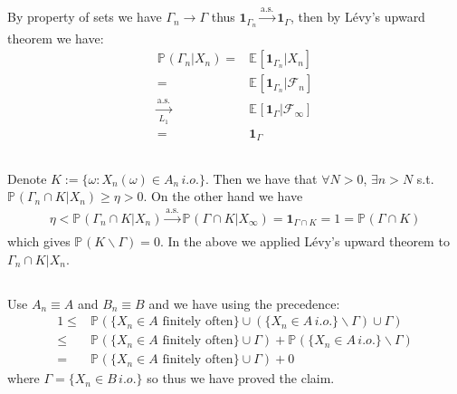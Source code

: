 \documentclass[11pt,a4paper]{ctexart}
\numberwithin{equation}{section}%
\newcommand{\F}{\mathcal{F}}
\begin{document}
\subsection{}

By property of sets we have $ \Gamma _n \to \Gamma  $ thus $ \mathbf{1}_{\Gamma _n} \xrightarrow[]{\mathrm{a.s.}}  \mathbf{1}_{\Gamma } $, then by L\'evy's upward theorem we have:
\begin{align*}
    \mathbb{P}_{  }\left( \Gamma _n  |X_n \right)  = & \mathbb{E}_{  }\left[ \mathbf{1}_{\Gamma _n} | X_n \right]\\
    =&  \mathbb{E}_{  }\left[ \mathbf{1}_{\Gamma _n} | \F_n \right] \\
    \xrightarrow[L_1]{\mathrm{a.s.}} & \mathbb{E}_{  }\left[ \mathbf{1}_{\Gamma } | \F_\infty \right] \\
    =& \mathbf{1}_{\Gamma }
\end{align*}


\subsection{}

Denote $ K:= \{\omega : X_n(\omega ) \in A_n \, i.o. \} $. Then we have that $ \forall N >0 $, $ \exists n>N $ s.t. $ \mathbb{P}_{  }\left( \Gamma _n \cap K | X_n  \right) \geq \eta >0 $. On the other hand we have
\begin{align*}
    \eta < \mathbb{P}_{  }\left( \Gamma _n \cap K | X_n \right) \xrightarrow[]{\mathrm{a.s.}} \mathbb{P}_{  }\left( \Gamma \cap K | X_{\infty} \right) = \mathbf{1}_{\Gamma \cap K} = 1 = \mathbb{P}_{  }\left( \Gamma \cap K \right) 
\end{align*}
which gives $ \mathbb{P}_{  }\left( K \backslash \Gamma  \right) =0 $. In the above we applied L\'evy's upward theorem to $ \Gamma_n \cap K | X_n $.


\subsection{}

Use $ A_n \equiv A $ and $ B_n \equiv B $ and we have using the precedence:
\begin{align*}
    1 \leq & \mathbb{P}_{  }\left( \{X_n \in A \text{ finitely often} \} \cup (\{X_n \in A \,i.o. \}\backslash \Gamma ) \cup \Gamma   \right)\\
    \leq& \mathbb{P}_{  }\left( \{X_n \in A \text{ finitely often} \} \cup \Gamma   \right) + \mathbb{P}_{  }\left( \{X_n \in A \,i.o. \}\backslash \Gamma   \right)\\
    =& \mathbb{P}_{  }\left( \{X_n \in A \text{ finitely often} \} \cup \Gamma   \right) + 0
\end{align*}
where $ \Gamma =\{ X_n\in B \,i.o.\} $ so thus we have proved the claim.
\end{document}
